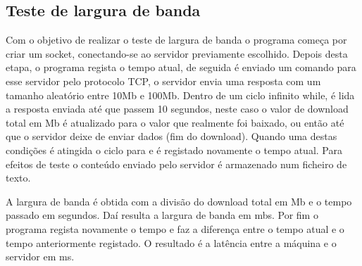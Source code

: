 \documentclass{report}
\begin{document}
\subsection{Teste de largura de banda}
\par Com o objetivo de realizar o teste de largura de banda o programa começa por criar um socket, conectando-se ao servidor previamente escolhido.
Depois desta etapa, o programa regista o tempo atual, de seguida é enviado um comando para esse servidor pelo protocolo TCP\cite{tcp}, 
o servidor envia uma resposta com um tamanho aleatório entre 10Mb e 100Mb. Dentro de um ciclo infinito while, é lida a resposta enviada até que passem 10 segundos, neste caso 
o valor de download total em Mb é atualizado para o valor que realmente foi baixado, ou então até que o servidor 
deixe de enviar dados (fim do download). Quando uma destas condições é atingida o ciclo para e é registado novamente o tempo atual. Para efeitos de teste o conteúdo enviado pelo servidor
é armazenado num ficheiro de texto.
\par A largura de banda é obtida com a divisão do download total em Mb e o tempo passado em segundos. Daí resulta a largura de banda em \ac{mbs}.
Por fim o programa regista novamente o tempo e faz a diferença entre o tempo atual e o tempo anteriormente registado. O resultado é a latência entre a máquina e o servidor em \ac{ms}.
\end{document}
